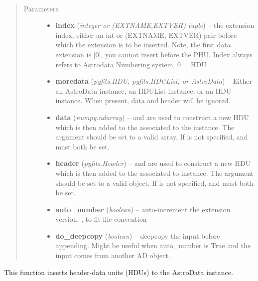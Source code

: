 \documentclass[letterpaper,10pt,english]{sphinxmanual}
\begin{document}
\begin{fulllineitems}
\label{chapter_AstroDataClass:astrodata.data.AstroData.insert}~\begin{quote}\begin{description}
\item[{Parameters}] \leavevmode\begin{itemize}
\item {} 
\textbf{index} (\emph{integer or (EXTNAME,EXTVER) tuple}) -- the extension index, either an int or (EXTNAME, EXTVER)
pair before which the extension is to be inserted. Note, the 
first data extension is {[}0{]}, you cannot insert before the PHU.
Index always refers to Astrodata Numbering system, 0 = HDU

\item {} 
\textbf{moredata} (\emph{pyfits.HDU, pyfits.HDUList, or AstroData}) -- Either an AstroData instance, an HDUList instance, or
an HDU instance. When present, data and header will be ignored.

\item {} 
\textbf{data} (\emph{numpy.ndarray}) --  and  are used to construct a new HDU which is then 
added to the  associated to the  instance. The  
argument should be set
to a valid  array. If  is not specified,  and 
must both be set.

\item {} 
\textbf{header} (\emph{pyfits.Header}) --  and  are used
to construct a new HDU which is then added to the  associated to 
 instance. The  argument should be set to a
valid  object. If  is not specified,  and
 must both be set.

\item {} 
\textbf{auto\_number} (\emph{boolean}) -- auto-increment the extension version, , to fit file convention

\item {} 
\textbf{do\_deepcopy} (\emph{boolean}) -- deepcopy the input before appending.  Might be useful
when auto\_number is True and the input comes from another AD object.

\end{itemize}

\end{description}\end{quote}

This function inserts header-data units (HDUs) to the AstroData
instance.

\end{fulllineitems}
\end{document}
